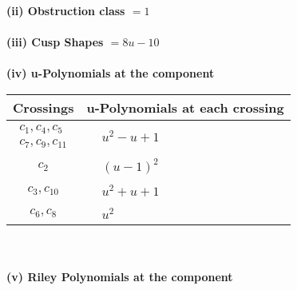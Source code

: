 \documentclass[1p]{elsarticle_modified}
\theoremstyle{definition}
\begin{document}
\flushleft \textbf{(ii) Obstruction class $= 1$}\\~\\
\flushleft \textbf{(iii) Cusp Shapes $= 8 u-10$}\\~\\
\newpage\renewcommand{\arraystretch}{1}
\flushleft \textbf{(iv) u-Polynomials at the component}\newline \\
\begin{tabular}{m{50pt}|m{274pt}}
Crossings & \hspace{64pt}u-Polynomials at each crossing \\
\hline $$\begin{aligned}c_{1},c_{4},c_{5}\\c_{7},c_{9},c_{11}\end{aligned}$$&$\begin{aligned}
&u^2- u+1
\end{aligned}$\\
\hline $$\begin{aligned}c_{2}\end{aligned}$$&$\begin{aligned}
&(u-1)^2
\end{aligned}$\\
\hline $$\begin{aligned}c_{3},c_{10}\end{aligned}$$&$\begin{aligned}
&u^2+u+1
\end{aligned}$\\
\hline $$\begin{aligned}c_{6},c_{8}\end{aligned}$$&$\begin{aligned}
&u^2
\end{aligned}$\\
\hline
\end{tabular}\\~\\
\newpage\renewcommand{\arraystretch}{1}
\flushleft \textbf{(v) Riley Polynomials at the component}\newline \\
\end{document}
